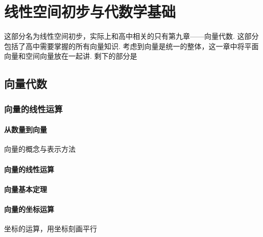 \part{线性空间初步与代数学基础}

这部分名为线性空间初步，实际上和高中相关的只有第九章——向量代数. 这部分包括了高中需要掌握的所有向量知识. 
考虑到向量是统一的整体，这一章中将平面向量和空间向量放在一起讲. 剩下的部分是
\chapter{向量代数}

\clearpage

\section{向量的线性运算}
\subsection{从数量到向量}
向量的概念与表示方法
\clearpage
\subsection{向量的线性运算}

\clearpage
\subsection{向量基本定理}
\clearpage

\subsection{向量的坐标运算}

坐标的运算，用坐标刻画平行
\clearpage
